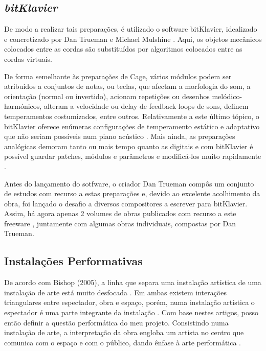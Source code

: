\documentclass[../main.tex]{subfiles}
\begin{document}
\subsection*{\textsl{bitKlavier}}
De modo a realizar tais preparações, é utilizado o software bitKlavier, idealizado e concretizado por Dan Trueman e Michael Mulshine \cite{trueman2019}.
Aqui, os objetos mecânicos colocados entre as cordas são substituídos por algoritmos colocados entre as cordas virtuais.

De forma semelhante às preparações de Cage, vários módulos podem ser atribuidos a conjuntos de notas, ou teclas, que afectam a morfologia do som, a orientação (normal ou invertido), acionam repetições ou desenhos melódico-harmónicos, alteram a velocidade ou delay de feedback loops de sons, definem temperamentos costumizados, entre outros.
Relativamente a este último tópico, o bitKlavier oferece enúmeras configurações de temperamento estático e adaptativo que não seriam possíveis num piano acústico \cite{trueman2019b}.
Mais ainda, as preparações analógicas demoram tanto ou mais tempo quanto as digitais e com bitKlavier é possível guardar patches, módulos e parâmetros e modificá-los muito rapidamente \cite{trueman2019}.

Antes do lançamento do sotfware, o criador Dan Trueman compôs um conjunto de estudos com recurso a estas preparações e, devido ao excelente acolhimento da obra, foi lançado o desafio a diversos compositores a escrever para bitKlavier.
Assim, há agora apenas 2 volumes de obras publicados com recurso a este freeware \cite{trueman2015a,trueman2015b}, juntamente com algumas obras individuais, compostas por Dan Trueman.

\subsection*{Instalações Performativas}
De acordo com Bishop (2005), a linha que separa uma instalação artística de uma instalação de arte está muito desfocada \cite{bishop2005}.
Em ambas existem interações triangulares entre espectador, obra e espaço, porém, numa instalação artística o espectador é uma parte integrante da instalação \cite{reiss1999}.
Com base nestes artigos, posso então definir a questão performática do meu projeto.
Consistindo numa instalação de arte, a interpretação da obra engloba um artista no centro que comunica com o espaço e com o público, dando ênfase à arte performática \cite{carlson1996}.
\end{document}
